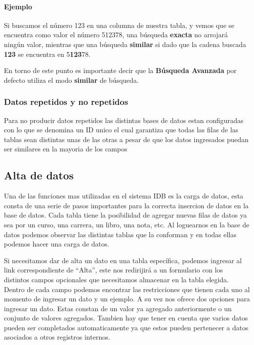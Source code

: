 \documentclass[a4paper,10pt]{article}
\begin{document}
\paragraph{Ejemplo} Si buscamos el número 123 en una columna de nuestra tabla, y vemos que se encuentra como valor el número 512378, una búsqueda \textbf{exacta} no arrojará ningún valor, mientras que una búsqueda \textbf{similar} si dado que la cadena buscada \textbf{123} se encuentra en 5\textbf{123}78.

En torno de este punto es importante decir que la \textbf{Búsqueda Avanzada} por defecto utiliza el modo \textbf{similar} de búsqueda.

\subsubsection{Datos repetidos y no repetidos}

Para no producir datos repetidos las distintas bases de datos estan configuradas con lo que se denomina un ID unico el cual garantiza que todas las filas de las tablas sean distintas unas de las otras a pesar de que los datos ingresados puedan ser similares en la mayoria de los campos 


\subsection{Alta de datos}

Una de las funciones mas utilizadas en el sistema IDB es la carga de datos, esta consta de una serie de pasos importantes para la correcta insercion de datos en la base de datos. Cada tabla tiene la posibilidad de agregar nuevas filas de datos ya sea por un curso, una carrera, un libro, una nota, etc. Al loguearnos en la base de datos podemos observar las distintas tablas que la conforman y en todas ellas podemos hacer una carga de datos. 

Si necesitamos dar de alta un dato en una tabla específica, podemos ingresar al link correspondiente de “Alta”, este nos redirijirá a un formulario con los distintos campos opcionales que necesitamos almacenar en la tabla elegida. 
Dentro de cada campo podemos encontrar las restricciones que tienen cada uno al momento de ingresar un dato y un ejemplo. A su vez nos ofrece dos opciones para ingresar un dato. Estas constan de un valor ya agregado anteriormente o un conjunto de valores agregados. Tambien hay que tener en cuenta que varios datos pueden ser completados automaticamente ya que estos pueden pertenecer a datos asociados a otros registros internos. 
\end{document}
